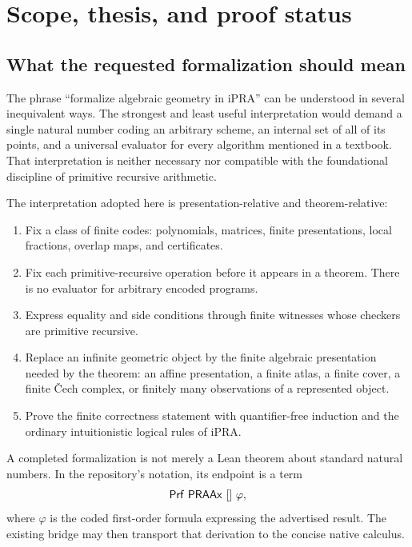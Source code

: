 \section{Scope, thesis, and proof status}

\subsection{What the requested formalization should mean}

The phrase ``formalize algebraic geometry in iPRA'' can be understood in several inequivalent
ways.  The strongest and least useful interpretation would demand a single natural number coding
an arbitrary scheme, an internal set of all of its points, and a universal evaluator for every
algorithm mentioned in a textbook.  That interpretation is neither necessary nor compatible with
the foundational discipline of primitive recursive arithmetic.

The interpretation adopted here is presentation-relative and theorem-relative:

\begin{enumerate}[label=\arabic*.]
\item Fix a class of finite codes: polynomials, matrices, finite presentations, local fractions,
      overlap maps, and certificates.
\item Fix each primitive-recursive operation before it appears in a theorem.  There is no evaluator
      for arbitrary encoded programs.
\item Express equality and side conditions through finite witnesses whose checkers are primitive
      recursive.
\item Replace an infinite geometric object by the finite algebraic presentation needed by the
      theorem: an affine presentation, a finite atlas, a finite cover, a finite \v{C}ech complex, or
      finitely many observations of a represented object.
\item Prove the finite correctness statement with quantifier-free induction and the ordinary
      intuitionistic logical rules of iPRA.
\end{enumerate}

A completed formalization is not merely a Lean theorem about standard natural numbers.  In the
repository's notation, its endpoint is a term
\[
                 \mathsf{Prf}\ \mathsf{PRAAx}\ []\ \varphi,
\]
where $\varphi$ is the coded first-order formula expressing the advertised result.  The existing
bridge  may then transport that derivation to the concise native calculus.


